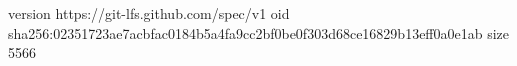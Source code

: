 version https://git-lfs.github.com/spec/v1
oid sha256:02351723ae7acbfac0184b5a4fa9cc2bf0be0f303d68ce16829b13eff0a0e1ab
size 5566
